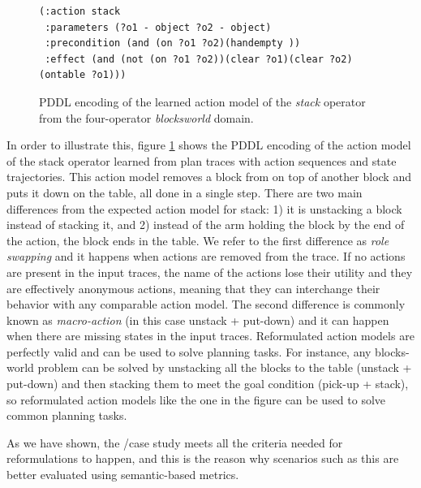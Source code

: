 \begin{figure}[hbt!]
	\begin{footnotesize}
		\begin{verbatim}
(:action stack
 :parameters (?o1 - object ?o2 - object)
 :precondition (and (on ?o1 ?o2)(handempty ))
 :effect (and (not (on ?o1 ?o2))(clear ?o1)(clear ?o2)(ontable ?o1)))
		\end{verbatim}
	\end{footnotesize}
	\caption{PDDL encoding of the learned action model of the {\em stack} operator from the four-operator {\em blocksworld} domain.}
	\label{fig:macroaction}
\end{figure}

In order to illustrate this, figure \ref{fig:macroaction} shows the PDDL encoding of the action model of the stack operator learned from plan traces with \NO action sequences and state trajectories. This action model removes a block from on top of another block and puts it down on the table, all done in a single step. There are two main differences from the expected action model for stack: 1) it is unstacking a block instead of stacking it, and 2) instead of the arm holding the block by the end of the action, the block ends in the table. We refer to the first difference as \emph{role swapping} and it happens when actions are removed from the trace. If no actions are present in the input traces, the name of the actions lose their utility and they are effectively anonymous actions, meaning that they can interchange their behavior with any comparable action model. The second difference is commonly known as \emph{macro-action} (in this case unstack + put-down) and it can happen when there are missing states in the input traces. Reformulated action models are perfectly valid and can be used to solve planning tasks. For instance, any blocks-world problem can be solved by unstacking all the blocks to the table (unstack + put-down) and then stacking them to meet the goal condition (pick-up + stack), so reformulated action models like the one in the figure can be used to solve common planning tasks.

As we have shown, the \NO/\NO case study meets all the criteria needed for reformulations to happen, and this is the reason why scenarios such as this are better evaluated using semantic-based metrics.


